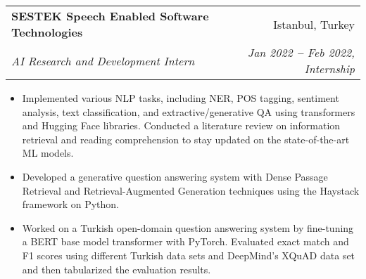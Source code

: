 \documentclass[letterpaper,11pt]{article}
\makeatletter
\newcommand{\resumeItem}[1]{
  \item\small{
    {#1 \vspace{-2pt}}
  }
}
\newcommand{\resumeSubheading}[4]{
  \vspace{-2pt}\item
    \begin{tabular*}{0.97\textwidth}[t]{l@{\extracolsep{\fill}}r}
      \textbf{#1} & #2 \\
      \textit{\small#3} & \textit{\small #4} \\
    \end{tabular*}\vspace{-7pt}
}
\newcommand{\resumeItemListStart}{\begin{itemize}}
\newcommand{\resumeItemListEnd}{\end{itemize}\vspace{-5pt}}
\makeatother
\begin{document}
    \resumeSubheading
      {SESTEK Speech Enabled Software Technologies}{Istanbul, Turkey}
      {AI Research and Development Intern}{Jan 2022 \textbf{--} Feb 2022, Internship}
        \resumeItemListStart
            \resumeItem{Implemented various NLP tasks, including NER, POS tagging, sentiment analysis, text classification, and extractive/generative QA using transformers and Hugging Face libraries. Conducted a literature review on information retrieval and reading comprehension to stay updated on the state-of-the-art ML models.}
            \resumeItem{Developed a generative question answering system with Dense Passage Retrieval and Retrieval-Augmented Generation techniques using the Haystack framework on Python.}
            \resumeItem{Worked on a Turkish open-domain question answering system by fine-tuning a BERT base model transformer with PyTorch. Evaluated exact match and F1 scores using different Turkish data sets and DeepMind's XQuAD data set and then tabularized the evaluation results.}
        \resumeItemListEnd
    

    
\end{document}
